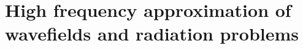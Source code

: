 \documentclass[%
	paper=A4,					%
	twoside=true,				%
	openright,					%
	chapterprefix=true,			%
	11pt,						%
	headings=normal,			%
	bibliography=totoc,			%
	listof=totoc,				%
	titlepage=on,				%
	captions=tableabove,		%
	draft=false,				%
]{scrreprt}
\begin{document}
\sloppy



\pagestyle{empty}				%
\cleardoublepage

%

\cleardoublepage

\pagestyle{plain}				%
\setcounter{tocdepth}{2}		%
\tableofcontents				%
\cleardoublepage
{}			%
\setcounter{page}{1}			%
\pagestyle{maincontentstyle} 	%

%

%
%
%
%
\chapter{High frequency approximation of wavefields and radiation problems}
\label{sec:high_freq_approx}

%
%
%
%
%
%
\end{document}
